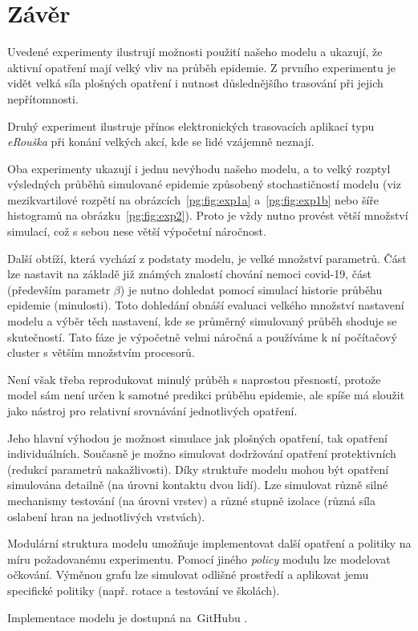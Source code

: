 \section*{Závěr}

Uvedené experimenty ilustrují možnosti použití našeho modelu a
ukazují, že aktivní opatření mají velký vliv na průběh epidemie. Z
prvního experimentu je vidět velká síla plošných opatření i nutnost
důslednějšího trasování při jejich nepřítomnosti.

Druhý experiment ilustruje přínos elektronických trasovacích aplikací
typu {\em eRouška} při konání velkých akcí, kde se lidé vzájemně
neznají.

Oba experimenty ukazují i jednu nevýhodu našeho modelu, a to velký rozptyl 
výsledných průběhů simulované epidemie způsobený stochastičností modelu (viz mezikvartilové rozpětí na
obrázcích~\ref{pg:fig:exp1a} a~\ref{pg:fig:exp1b} nebo šíře histogramů
na obrázku~\ref{pg:fig:exp2}). Proto je vždy nutno provést větší množství
simulací, což s sebou nese větší výpočetní náročnost.

Další obtíží, která vychází z podstaty modelu, je velké množství parametrů. Část lze nastavit na základě
již známých znalostí chování nemoci covid-19, část (především parametr $\beta$) je nutno dohledat pomocí simulací historie průběhu epidemie (minulosti). Toto dohledání obnáší evaluaci velkého množství nastavení modelu a výběr těch nastavení, kde se průměrný simulovaný průběh shoduje se skutečností. Tato fáze je výpočetně velmi náročná a používáme k ní počítačový cluster s větším množstvím procesorů. 

Není však třeba reprodukovat minulý průběh s naprostou přesností, protože model sám není určen k samotné predikci průběhu epidemie, ale spíše má sloužit jako nástroj pro relativní srovnávání jednotlivých opatření. 

Jeho hlavní výhodou je možnost simulace jak plošných opatření, tak
opatření individuálních. Současně je možno simulovat dodržování
opatření protektivních (redukcí parametrů nakažlivosti). Díky
struktuře modelu mohou být opatření simulována detailně (na úrovni
kontaktu dvou lidí). Lze simulovat různě silné mechanismy testování
(na úrovni vrstev) a různé stupně izolace (různá síla oslabení hran
na jednotlivých vrstvách).


Modulární struktura modelu umožňuje implementovat další opatření a
politiky na míru požadovanému experimentu. Pomocí jiného {\em policy}
modulu lze modelovat očkování. Výměnou grafu lze simulovat odlišné
prostředí a aplikovat jemu specifické politiky (např. rotace a testování
ve školách).


Implementace modelu je dostupná na~GitHubu \cite{pg:mmsoft}.


